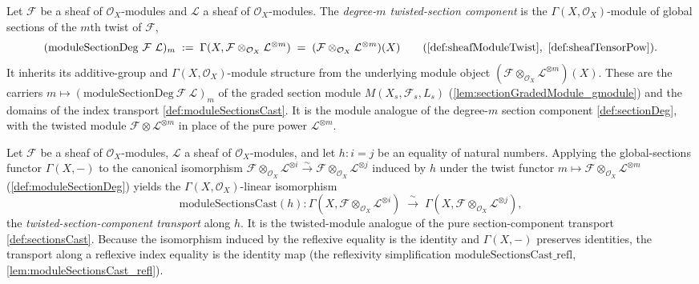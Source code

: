 \begin{definition}\leanok
  \label{def:moduleSectionDeg}
  Let \(\mathcal{F}\) be a sheaf of \(\mathcal{O}_X\)-modules and \(\mathcal{L}\) a
  sheaf of \(\mathcal{O}_X\)-modules. The \emph{degree-\(m\) twisted-section
  component} is the \(\Gamma(X,\mathcal{O}_X)\)-module of global sections of the
  \(m\)th twist of \(\mathcal{F}\),
  \[
    (\mathrm{moduleSectionDeg}\ \mathcal{F}\ \mathcal{L})_m
      \;:=\; \Gamma(X, \mathcal{F} \otimes_{\mathcal{O}_X} \mathcal{L}^{\otimes m})
      \;=\; (\mathcal{F} \otimes_{\mathcal{O}_X} \mathcal{L}^{\otimes m})(X)
        \qquad(\cref{def:sheafModuleTwist},\ \cref{def:sheafTensorPow}).
  \]
  It inherits its additive-group and \(\Gamma(X,\mathcal{O}_X)\)-module structure
  from the underlying module object
  \((\mathcal{F} \otimes_{\mathcal{O}_X} \mathcal{L}^{\otimes m})(X)\). These are the
  carriers \(m \mapsto (\mathrm{moduleSectionDeg}\ \mathcal{F}\ \mathcal{L})_m\) of
  the graded section module \(M(X_s, \mathcal{F}_s, L_s)\)
  (\cref{lem:sectionGradedModule_gmodule}) and the domains of the index transport
  \cref{def:moduleSectionsCast}. It is the module analogue of the degree-\(m\)
  section component \cref{def:sectionDeg}, with the twisted module
  \(\mathcal{F} \otimes \mathcal{L}^{\otimes m}\) in place of the pure power
  \(\mathcal{L}^{\otimes m}\).
\end{definition}

\begin{definition}\leanok
  \label{def:moduleSectionsCast}
  Let \(\mathcal{F}\) be a sheaf of \(\mathcal{O}_X\)-modules, \(\mathcal{L}\) a sheaf
  of \(\mathcal{O}_X\)-modules, and let \(h : i = j\) be an equality of natural
  numbers. Applying the global-sections functor \(\Gamma(X,-)\) to the canonical
  isomorphism
  \(\mathcal{F} \otimes_{\mathcal{O}_X} \mathcal{L}^{\otimes i}
    \xrightarrow{\sim}
    \mathcal{F} \otimes_{\mathcal{O}_X} \mathcal{L}^{\otimes j}\)
  induced by \(h\) under the twist functor
  \(m \mapsto \mathcal{F} \otimes_{\mathcal{O}_X} \mathcal{L}^{\otimes m}\)
  (\cref{def:moduleSectionDeg}) yields the \(\Gamma(X,\mathcal{O}_X)\)-linear
  isomorphism
  \[
    \mathrm{moduleSectionsCast}(h) :
    \Gamma(X, \mathcal{F} \otimes_{\mathcal{O}_X} \mathcal{L}^{\otimes i})
      \;\xrightarrow{\ \sim\ }\;
    \Gamma(X, \mathcal{F} \otimes_{\mathcal{O}_X} \mathcal{L}^{\otimes j}),
  \]
  the \emph{twisted-section-component transport} along \(h\). It is the
  twisted-module analogue of the pure section-component transport
  \cref{def:sectionsCast}. Because the isomorphism induced by the reflexive equality
  is the identity and \(\Gamma(X,-)\) preserves identities, the transport along a
  reflexive index equality is the identity map (the reflexivity simplification
  \(\mathrm{moduleSectionsCast\_refl}\), \cref{lem:moduleSectionsCast_refl}).
\end{definition}

